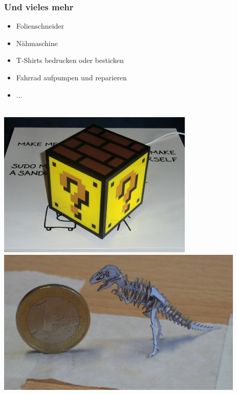 \documentclass[t]{beamer}
\begin{document}
\begin{frame}
	\frametitle{Und vieles mehr}
	\begin{itemize}
		\item Folienschneider
		\item Nähmaschine
		\item T-Shirts bedrucken oder besticken
		\item Fahrrad aufpumpen und reparieren
		\item ...
	\end{itemize}
	\begin{center}
		~\\
		
		\includegraphics[height=7cm]{../img/mariolampe.jpg}
		\hspace{1em}
		\includegraphics[height=7cm]{../img/tinysaur.jpg}
	\end{center}
\end{frame}

\end{document}
